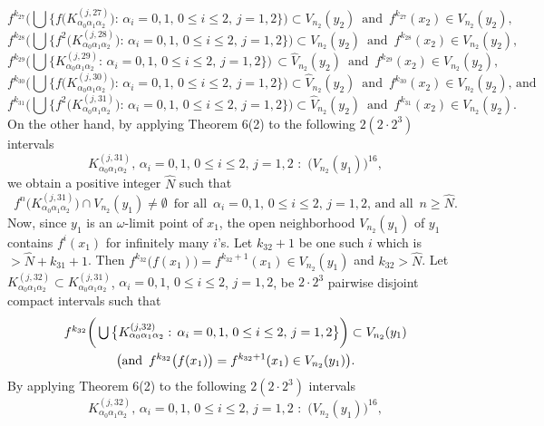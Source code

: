\documentclass[12pt]{article}
\newcommand{\al}{\alpha}
\begin{document}
$$
f^{k_{27}}\bigg(\bigcup \big\{ f\big(K_{\al_0\al_1\al_2}^{(j,27)}\big): \, \al_i = 0, 1, \, 0 \le i \le 2, \, j = 1, 2 \big\}\bigg) \subset V_{n_2}(y_2) \,\,\, \text{and} \,\,\, f^{k_{27}}(x_2) \in V_{n_2}(y_2), 
$$
$$
f^{k_{28}}\bigg(\bigcup \big\{ f^2\big(K_{\al_0\al_1\al_2}^{(j,28)}\big): \, \al_i = 0, 1, \, 0 \le i \le 2, \, j = 1, 2 \big\}\bigg) \subset V_{n_2}(y_2) \,\,\, \text{and} \,\,\, f^{k_{28}}(x_2) \in V_{n_2}(y_2),
$$
$$
f^{k_{29}}\bigg(\bigcup \big\{ K_{\al_0\al_1\al_2}^{(j,29)}: \, \al_i = 0, 1, \, 0 \le i \le 2, \, j = 1, 2 \big\}\bigg) \, \subset \widehat V_{n_2}(y_2) \,\,\, \text{and} \,\,\, f^{k_{29}}(x_2) \in V_{n_2}(y_2),  
$$
$$
f^{k_{30}}\bigg(\bigcup \big\{ f\big(K_{\al_0\al_1\al_2}^{(j,30)}\big): \, \al_i = 0, 1, \, 0 \le i \le 2, \, j = 1, 2 \big\}\bigg) \subset \widehat V_{n_2}(y_2) \,\,\, \text{and} \,\,\, f^{k_{30}}(x_2) \in V_{n_2}(y_2), \, \text{and}
$$
$$
f^{k_{31}}\bigg(\bigcup \big\{ f^2\big(K_{\al_0\al_1\al_2}^{(j,31)}\big): \, \al_i = 0, 1, \, 0 \le i \le 2, \, j = 1, 2 \big\}\bigg) \subset \widehat V_{n_2}(y_2) \,\,\, \text{and} \,\,\, f^{k_{31}}(x_2) \in V_{n_2}(y_2).
$$
\indent On the other hand, by applying Theorem 6(2) to the following $2(2 \cdot 2^3)$ intervals
$$
K_{\al_0\al_1\al_2}^{(j,31)}, \, \al_i = 0, 1, \, 0 \le i \le 2, \, j = 1, 2 \,\, : \,\, \big(V_{n_2}(y_1)\big)^{16},
$$
we obtain a positive integer $\widehat N$ such that 
$$
f^n\big(K_{\al_0\al_1\al_2}^{(j,31)}\big) \cap V_{n_2}(y_1) \ne \emptyset \,\,\, \text{for all} \,\,\, \al_i = 0, 1, \, 0 \le i \le 2, \, j = 1, 2, \, \text{and all} \,\,\, n \ge \widehat N.
$$
\indent Now, since $y_1$ is an $\omega$-limit point of $x_1$, the open neighborhood $V_{n_2}(y_1)$ of $y_1$ contains $f^i(x_1)$ for infinitely many $i$'s.  Let $k_{32}+1$ be one such $i$ which is $> \widehat N+k_{31}+1$.  Then $f^{k_{32}}\big(f(x_1)\big) = f^{k_{32}+1}(x_1) \in V_{n_2}(y_1)$ and $k_{32} > \widehat N$.  Let $K_{\al_0\al_1\al_2}^{(j,32)} \subset K_{\al_0\al_1\al_2}^{(j,31)}$, $\al_i = 0, 1$, $0 \le i \le 2$, $j = 1, 2$, be $2 \cdot 2^3$ pairwise disjoint compact intervals such that 
\begin{multline*}
$$
f^{k_{32}}\bigg(\bigcup \big\{ K_{\al_0\al_1\al_2}^{(j,32)}: \, \al_i = 0, 1, \, 0 \le i \le 2, \, j = 1, 2 \big\}\bigg) \subset V_{n_2}(y_1) \\ \big(\text{and} \,\,\, f^{k_{32}}\big(f(x_1)\big) = f^{k_{32}+1}(x_1) \in V_{n_2}(y_1)\big).
$$
\end{multline*}
\indent By applying Theorem 6(2) to the following $2(2 \cdot 2^3)$ intervals 
$$
K_{\al_0\al_1\al_2}^{(j,32)}, \, \al_i = 0, 1, \, 0 \le i \le 2, \, j = 1, 2 \,\, : \,\, \big(V_{n_2}(y_1)\big)^{16},
$$
\end{document}
